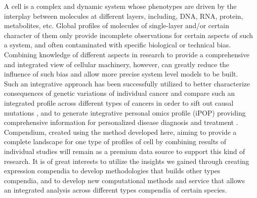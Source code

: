 
A cell is a complex and dynamic system whose phenotypes are driven by
the interplay between molecules at different layers, including, DNA,
RNA, protein, metabolites, etc.
%
Global profiles of molecules of single-layer and/or certain character
of them only provide incomplete observations for certain aspects of
such a system, and often contaminated with specific biological or
technical bias.
%
Combining knowledge of different aspects in research to provide a
comprehensive and integrated view of cellular machinery, however, can
greatly reduce the influence of such bias and allow more precise
system level models to be built.
%
%
Such an integrative approach has been successfully utilized 
to better characterize consequences of genetic variations of
individual cancer and compare such an integrated profile across
different types of cancers in order to sift out causal mutations
\cite{Weinstein2013}, and to generate integrative personal omics
profile (iPOP) providing comprehensive information for personalized
disease diagnosis and treatment \cite{Chen2012}.
%
Compendium, created using the method developed here, aiming to provide
a complete landscape for one type of profiles of cell by combining
results of individual studies will remain as a premium data source to
support this kind of research.
%
It is of great interests to utilize the insights we gained through
creating expression compendia to develop methodologies that builds
other types compendia, and to develop new computational methods and
service that allows an integrated analysis across different types
compendia of certain species.





